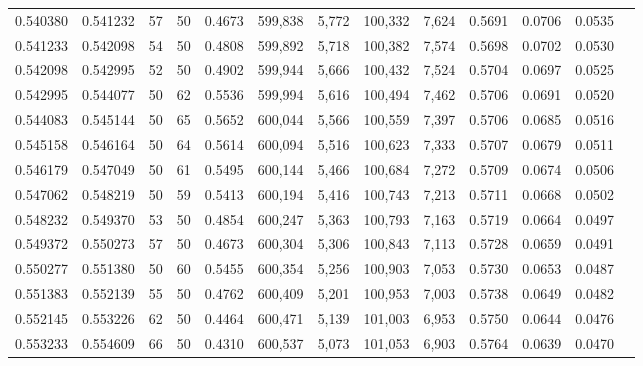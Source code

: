 \begin{tabular}{rrrrrrrrrrrrr}
0.540380 & 0.541232 &    57 &  50 &                                     0.4673 & 599,838 &   5,772 & 100,332 &   7,624 & 0.5691 & 0.0706 & 0.0535 \\
0.541233 & 0.542098 &    54 &  50 &                                     0.4808 & 599,892 &   5,718 & 100,382 &   7,574 & 0.5698 & 0.0702 & 0.0530 \\
0.542098 & 0.542995 &    52 &  50 &                                     0.4902 & 599,944 &   5,666 & 100,432 &   7,524 & 0.5704 & 0.0697 & 0.0525 \\
0.542995 & 0.544077 &    50 &  62 &                                     0.5536 & 599,994 &   5,616 & 100,494 &   7,462 & 0.5706 & 0.0691 & 0.0520 \\
0.544083 & 0.545144 &    50 &  65 &                                     0.5652 & 600,044 &   5,566 & 100,559 &   7,397 & 0.5706 & 0.0685 & 0.0516 \\
0.545158 & 0.546164 &    50 &  64 &                                     0.5614 & 600,094 &   5,516 & 100,623 &   7,333 & 0.5707 & 0.0679 & 0.0511 \\
0.546179 & 0.547049 &    50 &  61 &                                     0.5495 & 600,144 &   5,466 & 100,684 &   7,272 & 0.5709 & 0.0674 & 0.0506 \\
0.547062 & 0.548219 &    50 &  59 &                                     0.5413 & 600,194 &   5,416 & 100,743 &   7,213 & 0.5711 & 0.0668 & 0.0502 \\
0.548232 & 0.549370 &    53 &  50 &                                     0.4854 & 600,247 &   5,363 & 100,793 &   7,163 & 0.5719 & 0.0664 & 0.0497 \\
0.549372 & 0.550273 &    57 &  50 &                                     0.4673 & 600,304 &   5,306 & 100,843 &   7,113 & 0.5728 & 0.0659 & 0.0491 \\
0.550277 & 0.551380 &    50 &  60 &                                     0.5455 & 600,354 &   5,256 & 100,903 &   7,053 & 0.5730 & 0.0653 & 0.0487 \\
0.551383 & 0.552139 &    55 &  50 &                                     0.4762 & 600,409 &   5,201 & 100,953 &   7,003 & 0.5738 & 0.0649 & 0.0482 \\
0.552145 & 0.553226 &    62 &  50 &                                     0.4464 & 600,471 &   5,139 & 101,003 &   6,953 & 0.5750 & 0.0644 & 0.0476 \\
0.553233 & 0.554609 &    66 &  50 &                                     0.4310 & 600,537 &   5,073 & 101,053 &   6,903 & 0.5764 & 0.0639 & 0.0470 \\

\end{tabular}
